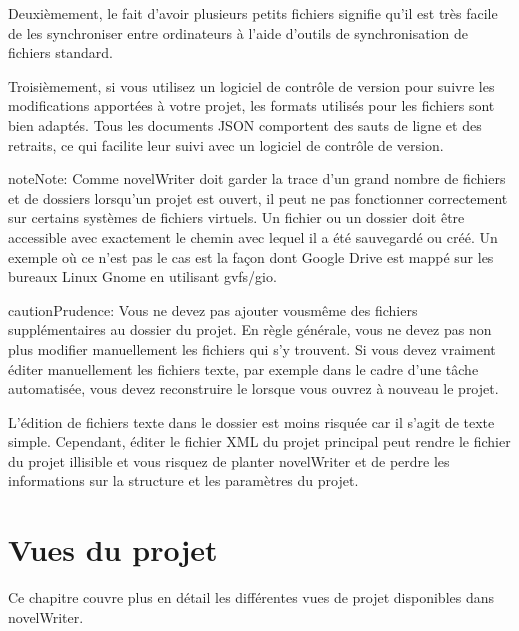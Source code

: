 \documentclass[a4paper,11pt,french]{sphinxmanual}
\begin{document}
\sphinxAtStartPar
Deuxièmement, le fait d’avoir plusieurs petits fichiers signifie qu’il est très facile de les synchroniser entre ordinateurs à l’aide d’outils de synchronisation de fichiers standard.

\sphinxAtStartPar
Troisièmement, si vous utilisez un logiciel de contrôle de version pour suivre les modifications apportées à votre projet, les formats utilisés pour les fichiers sont bien adaptés. Tous les documents JSON comportent des sauts de ligne et des retraits, ce qui facilite leur suivi avec un logiciel de contrôle de version.

\begin{sphinxadmonition}{note}{Note:}
\sphinxAtStartPar
Comme novelWriter doit garder la trace d’un grand nombre de fichiers et de dossiers lorsqu’un projet est ouvert, il peut ne pas fonctionner correctement sur certains systèmes de fichiers virtuels. Un fichier ou un dossier doit être accessible avec exactement le chemin avec lequel il a été sauvegardé ou créé. Un exemple où ce n’est pas le cas est la façon dont Google Drive est mappé sur les bureaux Linux Gnome en utilisant gvfs/gio.
\end{sphinxadmonition}

\begin{sphinxadmonition}{caution}{Prudence:}
\sphinxAtStartPar
Vous ne devez pas ajouter vous\sphinxhyphen{}même des fichiers supplémentaires au dossier du projet. En règle générale, vous ne devez pas non plus modifier manuellement les fichiers qui s’y trouvent. Si vous devez vraiment éditer manuellement les fichiers texte, par exemple dans le cadre d’une tâche automatisée, vous devez reconstruire le {\hyperref[\detokenize{int_glossary:term-Project-Index}]{}} lorsque vous ouvrez à nouveau le projet.

\sphinxAtStartPar
L’édition de fichiers texte dans le dossier  est moins risquée car il s’agit de texte simple. Cependant, éditer le fichier XML du projet principal peut rendre le fichier du projet illisible et vous risquez de planter novelWriter et de perdre les informations sur la structure et les paramètres du projet.
\end{sphinxadmonition}

\sphinxstepscope


\chapter{Vues du projet}
\label{\detokenize{usage_project:project-views}}\label{\detokenize{usage_project:a-ui-project}}\label{\detokenize{usage_project::doc}}
\sphinxAtStartPar
Ce chapitre couvre plus en détail les différentes vues de projet disponibles dans novelWriter.
\end{document}
